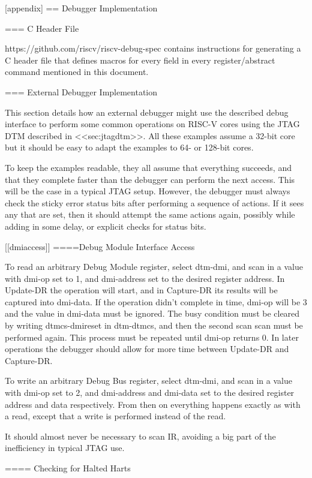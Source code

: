 [appendix]
== Debugger Implementation

=== C Header File

https://github.com/riscv/riscv-debug-spec contains instructions for generating
a C header file that defines macros for every field in every register/abstract
command mentioned in this document.

=== External Debugger Implementation

This section details how an external debugger might use the described debug
interface to perform some common operations on RISC-V cores using the JTAG DTM
described in <<sec:jtagdtm>>.
All these examples assume a 32-bit core but it should be easy to adapt the
examples to 64- or 128-bit cores.

To keep the examples readable, they all assume that everything succeeds, and
that they complete faster than the debugger can perform the next access. This
will be the case in a typical JTAG setup. However, the debugger must always
check the sticky error status bits after performing a sequence of actions. If
it sees any that are set, then it should attempt the same actions again,
possibly while adding in some delay, or explicit checks for status bits.

[[dmiaccess]]
====Debug Module Interface Access

To read an arbitrary Debug Module register, select {dtm-dmi}, and scan in a value
with {dmi-op} set to 1, and {dmi-address} set to the desired register address. In
Update-DR the operation will start, and in Capture-DR its results will be
captured into {dmi-data}.  If the operation didn't complete in time, {dmi-op} will be 3
and the value in {dmi-data} must be ignored. The busy condition must be cleared by
writing {dtmcs-dmireset} in {dtm-dtmcs}, and then the second scan scan must be performed again.
This process must be repeated until {dmi-op} returns 0.
In later operations the debugger should allow for more time between Update-DR and
Capture-DR.

To write an arbitrary Debug Bus register, select {dtm-dmi}, and scan in a value
with {dmi-op} set to 2, and {dmi-address} and {dmi-data} set to the desired register
address and data respectively. From then on everything happens exactly as with
a read, except that a write is performed instead of the read.

It should almost never be necessary to scan IR, avoiding a big part of the
inefficiency in typical JTAG use.

==== Checking for Halted Harts

